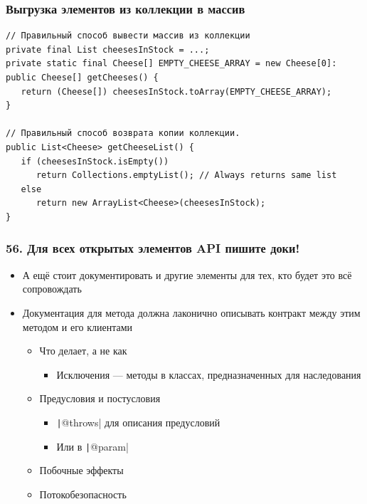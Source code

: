 \documentclass[xetex,mathserif,serif]{beamer}
\begin{document}
	\begin{frame}[fragile]
		\frametitle{Выгрузка элементов из коллекции в массив}
		\begin{small}
			\begin{verbatim}
// Правильный способ вывести массив из коллекции
private final List cheesesInStock = ...;
private static final Cheese[] EMPTY_CHEESE_ARRAY = new Cheese[0]:
public Cheese[] getCheeses() {
   return (Cheese[]) cheesesInStock.toArray(EMPTY_CHEESE_ARRAY);
}

// Правильный способ возврата копии коллекции.
public List<Cheese> getCheeseList() {
   if (cheesesInStock.isEmpty())  
      return Collections.emptyList(); // Always returns same list
   else 
      return new ArrayList<Cheese>(cheesesInStock);
}
			\end{verbatim}
		\end{small}
	\end{frame}

	\begin{frame}
		\frametitle{56. Для всех открытых элементов API пишите доки!}
		\begin{itemize}
			\item А ещё стоит документировать и другие элементы для тех, кто будет это всё сопровождать
			\item Документация для метода должна лаконично описывать контракт между этим методом и его клиентами
			\begin{itemize}
				\item Что делает, а не как
				\begin{itemize}
					\item Исключения --- методы в классах, предназначенных для наследования
				\end{itemize}
				\item Предусловия и постусловия
				\begin{itemize}
					\item \texttt|@throws| для описания предусловий
					\item Или в \texttt|@param|
				\end{itemize}
				\item Побочные эффекты
				\item Потокобезопасность
			\end{itemize}
		\end{itemize}
	\end{frame}
\end{document}
